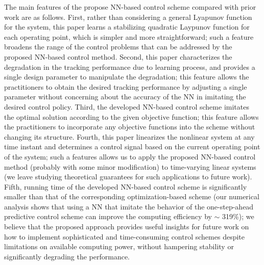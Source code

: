 \documentclass[1p,times]{elsarticle}
\begin{document}




The main features of the propose NN-based control scheme compared with prior work are as follows. First, rather than considering a general Lyapunov function for the system, this paper learns a stabilizing quadratic Laypunov function for each operating point, which is simpler and more straightforward; such a feature broadens the range of the control problems that can be addressed by the proposed NN-based control method. Second, this paper characterizes the degradation in the tracking performance due to learning process, and provides a single design parameter to manipulate the degradation; this feature allows the practitioners to obtain the desired tracking performance by adjusting a single parameter without concerning about the accuracy of the NN in imitating the desired control policy. Third, the developed NN-based control scheme imitates the optimal solution according to the given objective function; this feature allows the practitioners to incorporate any objective functions into the scheme without changing its structure. Fourth, this paper linearizes the nonlinear system at any time instant and determines a control signal based on the current operating point of the system; such a features allows us to apply the proposed NN-based control method (probably with some minor modification) to time-varying linear systems (we leave studying theoretical guarantees for such applications to future work). Fifth, running time of the developed NN-based control scheme is significantly smaller than that of the corresponding optimization-based scheme (our numerical analysis shows that using a NN that imitate the behavior of the one-step-ahead predictive control scheme can improve the computing efficiency by $\sim$ 319\%); we believe that the proposed approach provides useful insights for future work on how to implement sophisticated and time-consuming control schemes despite limitations on available computing power, without hampering stability or significantly degrading the performance. 
\end{document}
